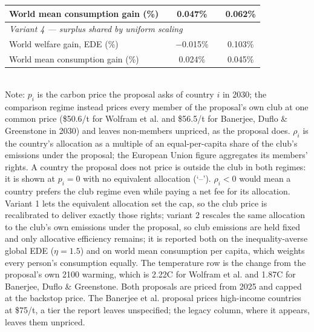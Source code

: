 \begin{table}[htbp]
\begin{tabular}{lcccc}
  \quad World mean consumption gain (\%) &  & 0.047\% &  & 0.062\% \\
  \midrule
  \multicolumn{5}{l}{\textit{Variant 4 --- surplus shared by uniform scaling}} \\
  \quad World welfare gain, EDE (\%) &  & $-$0.015\% &  & 0.103\% \\
  \quad World mean consumption gain (\%) &  & 0.024\% &  & 0.045\% \\
  \bottomrule
\end{tabular}
\label{tab:equiv_rights_B}
\\[4pt]
{\footnotesize Note: $p_i$ is the carbon price the proposal asks of country $i$ in 2030; the comparison regime instead prices every member of the proposal's own club at one common price (\$50.6/t for Wolfram et al. and \$56.5/t for Banerjee, Duflo \& Greenstone in 2030) and leaves non-members unpriced, as the proposal does. $\rho_i$ is the country's allocation as a multiple of an equal-per-capita share of the club's emissions under the proposal; the European Union figure aggregates its members' rights. A country the proposal does not price is outside the club in both regimes: it is shown at $p_i=0$ with no equivalent allocation (`--'). $\rho_i < 0$ would mean a country prefers the club regime even while paying a net fee for its allocation. Variant 1 lets the equivalent allocation set the cap, so the club price is recalibrated to deliver exactly those rights; variant 2 rescales the same allocation to the club's own emissions under the proposal, so club emissions are held fixed and only allocative efficiency remains; it is reported both on the inequality-averse global EDE ($\eta=1.5$) and on world mean consumption per capita, which weights every person's consumption equally. The temperature row is the change from the proposal's own 2100 warming, which is 2.22\textdegree{}C for Wolfram et al. and 1.87\textdegree{}C for Banerjee, Duflo \& Greenstone. Both proposals are priced from 2025 and capped at the backstop price. The Banerjee et al. proposal prices high-income countries at \$75/t, a tier the report leaves unspecified; the legacy column, where it appears, leaves them unpriced.}
\end{table}
